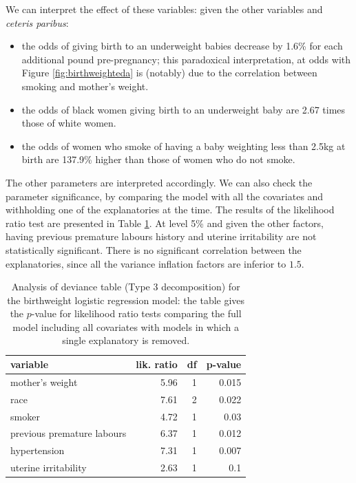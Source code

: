 \documentclass[
  11pt,
  letterpaper,
]{book}
\providecommand{\tightlist}{%
  \setlength{\itemsep}{0pt}\setlength{\parskip}{0pt}}
\theoremstyle{definition}
\theoremstyle{definition}
\theoremstyle{definition}
\theoremstyle{remark}
\begin{document}
We can interpret the effect of these variables: given the other variables and \emph{ceteris paribus}:

\begin{itemize}
\tightlist
\item
  the odds of giving birth to an underweight babies decrease by 1.6\% for each additional pound pre-pregnancy; this paradoxical interpretation, at odds with Figure \ref{fig:birthweighteda} is (notably) due to the correlation between smoking and mother's weight.
\item
  the odds of black women giving birth to an underweight baby are 2.67 times those of white women.
\item
  the odds of women who smoke of having a baby weighting less than 2.5kg at birth are 137.9\% higher than those of women who do not smoke.
\end{itemize}

The other parameters are interpreted accordingly. We can also check the parameter significance, by comparing the model with all the covariates and withholding one of the explanatories at the time. The results of the likelihood ratio test are presented in Table \ref{tab:type3birthwgt}. At level 5\% and given the other factors, having previous premature labours history and uterine irritability are not statistically significant. There is no significant correlation between the explanatories, since all the variance inflation factors are inferior to \(1.5\).

\begin{table}

\caption{\label{tab:type3birthwgt}Analysis of deviance table (Type 3 decomposition) for the birthweight logistic regression model: the table gives the $p$-value for likelihood ratio tests comparing the full model including all covariates with models in which a single explanatory is removed.}
\centering
\begin{tabular}[t]{lrrr}
\toprule
variable & lik. ratio & df & p-value\\
\midrule
mother's weight & 5.96 & 1 & 0.015\\
race & 7.61 & 2 & 0.022\\
smoker & 4.72 & 1 & 0.03\\
previous premature labours & 6.37 & 1 & 0.012\\
hypertension & 7.31 & 1 & 0.007\\
\addlinespace
uterine irritability & 2.63 & 1 & 0.1\\
\bottomrule
\end{tabular}
\end{table}
\end{document}

